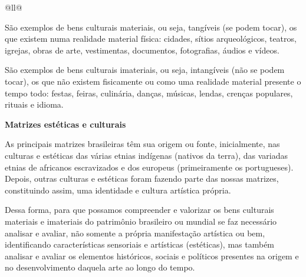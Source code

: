 \begin{itemize}
\begin{itemize}
\begin{escolha}[]{@{}ll@{}}
{São exemplos de bens culturais materiais, ou seja,
tangíveis (se podem tocar), os que existem numa realidade material
física: cidades, sítios arqueológicos, teatros, igrejas, obras de arte,
vestimentas, documentos, fotografias, áudios e
vídeos.

São exemplos de bens culturais imateriais, ou seja, intangíveis
(não se podem tocar), os que não existem fisicamente ou como uma
realidade material presente o tempo todo: festas, feiras, culinária,
danças, músicas, lendas, crenças populares, rituais e idioma.

\textbf{Matrizes estéticas e culturais}

As principais matrizes brasileiras têm sua origem ou fonte,
inicialmente, nas culturas e estéticas das várias etnias indígenas
(nativos da terra), das variadas etnias de africanos escravizados e dos
europeus (primeiramente os portugueses). Depois, outras culturas e
estéticas foram fazendo parte das nossas matrizes, constituindo assim,
uma identidade e cultura artística própria.

Dessa forma, para que possamos compreender e valorizar os bens culturais
materiais e imateriais do patrimônio brasileiro ou mundial se faz
necessário analisar e avaliar, não somente a própria manifestação
artística ou bem, identificando características sensoriais e artísticas
(estéticas), mas também analisar e avaliar os elementos históricos,
sociais e políticos presentes na origem e no desenvolvimento daquela
arte ao longo do tempo.}



\end{escolha}
\end{itemize}
\end{itemize}
